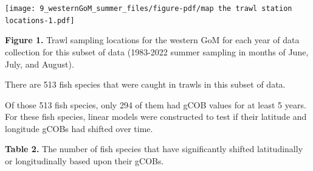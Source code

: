 \documentclass[
  letterpaper,
  DIV=11,
  numbers=noendperiod]{scrartcl}
\begin{document}
\newpage

\texttt{[image: 9\_westernGoM\_summer\_files/figure-pdf/map the trawl station locations-1.pdf]}

\textbf{Figure 1.} Trawl sampling locations for the western GoM for each
year of data collection for this subset of data (1983-2022 summer
sampling in months of June, July, and August).

There are 513 fish species that were caught in trawls in this subset of
data.

Of those 513 fish species, only 294 of them had gCOB values for at least
5 years. For these fish species, linear models were constructed to test
if their latitude and longitude gCOBs had shifted over time.

\newpage

\textbf{Table 2.} The number of fish species that have significantly
shifted latitudinally or longitudinally based upon their gCOBs.
\end{document}
